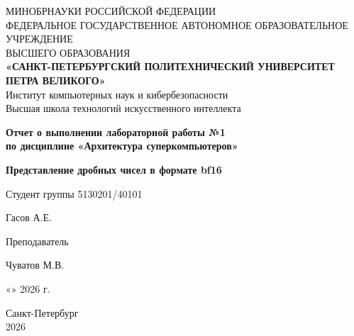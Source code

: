 \thispagestyle{empty}
\begin{center}
{\large
МИНОБРНАУКИ РОССИЙСКОЙ ФЕДЕРАЦИИ \\ФЕДЕРАЛЬНОЕ ГОСУДАРСТВЕННОЕ
АВТОНОМНОЕ ОБРАЗОВАТЕЛЬНОЕ УЧРЕЖДЕНИЕ \\ ВЫСШЕГО ОБРАЗОВАНИЯ \\ \vspace{7pt} \textbf{«САНКТ-ПЕТЕРБУРГСКИЙ ПОЛИТЕХНИЧЕСКИЙ УНИВЕРСИТЕТ ПЕТРА ВЕЛИКОГО»}\\ \vspace{7pt} Институт компьютерных наук и кибербезопасности\\ \vspace{4pt} Высшая школа технологий искусственного интеллекта

\vspace{100pt}
\textbf{Отчет о выполнении лабораторной работы №1}\\ \textbf{по дисциплине «Архитектура суперкомпьютеров»}
\par \vspace{8pt} \textbf{Представление дробных чисел в формате bf16}
}
\end{center}

\vspace{70pt}
\noindent Студент группы 5130201/40101 \vspace{-25pt} \begin{flushright} \underline{\hspace{4cm}} Гасов А.Е. \;\;\;
\end{flushright} \par

\noindent Преподаватель\vspace{-25pt}\begin{flushright} \underline{\hspace{4cm}} Чуватов М.В. \end{flushright}

\vspace{70pt}
\begin{flushright}
    «\underline{\hspace{0.6cm}}» \underline{\hspace{2.5cm}} 2026 г.
\end{flushright}

\vspace{60pt}
\begin{center}
Санкт-Петербург \\ 2026
\end{center}

\newpage
